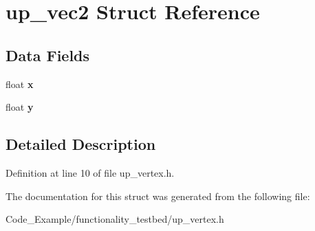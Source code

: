 \hypertarget{structup__vec2}{}\section{up\+\_\+vec2 Struct Reference}
\label{structup__vec2}
\subsection*{Data Fields}
\begin{DoxyCompactItemize}
\item 
\hypertarget{structup__vec2_ad0da36b2558901e21e7a30f6c227a45e}{}float {\bfseries x}\label{structup__vec2_ad0da36b2558901e21e7a30f6c227a45e}

\item 
\hypertarget{structup__vec2_aa4f0d3eebc3c443f9be81bf48561a217}{}float {\bfseries y}\label{structup__vec2_aa4f0d3eebc3c443f9be81bf48561a217}

\end{DoxyCompactItemize}


\subsection{Detailed Description}


Definition at line 10 of file up\+\_\+vertex.\+h.



The documentation for this struct was generated from the following file\+:\begin{DoxyCompactItemize}
\item 
Code\+\_\+\+Example/functionality\+\_\+testbed/up\+\_\+vertex.\+h\end{DoxyCompactItemize}

